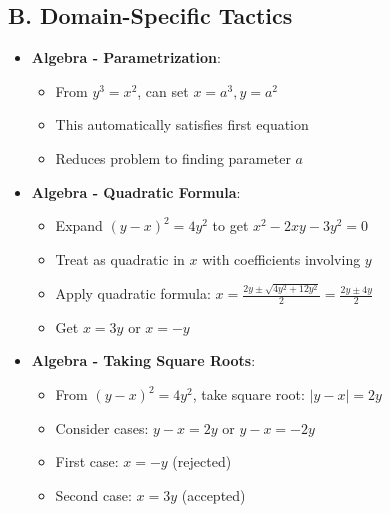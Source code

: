\documentclass[12pt]{article}
\begin{document}
\begin{tacticalbox}
\subsection*{B. Domain-Specific Tactics}
\begin{itemize}[leftmargin=*]
    \item \textbf{Algebra - Parametrization}:
    \begin{itemize}
        \item From $y^3 = x^2$, can set $x = a^3, y = a^2$
        \item This automatically satisfies first equation
        \item Reduces problem to finding parameter $a$
    \end{itemize}
    \item \textbf{Algebra - Quadratic Formula}:
    \begin{itemize}
        \item Expand $(y-x)^2 = 4y^2$ to get $x^2 - 2xy - 3y^2 = 0$
        \item Treat as quadratic in $x$ with coefficients involving $y$
        \item Apply quadratic formula: $x = \frac{2y \pm \sqrt{4y^2 + 12y^2}}{2} = \frac{2y \pm 4y}{2}$
        \item Get $x = 3y$ or $x = -y$
    \end{itemize}
    \item \textbf{Algebra - Taking Square Roots}:
    \begin{itemize}
        \item From $(y-x)^2 = 4y^2$, take square root: $|y-x| = 2y$
        \item Consider cases: $y-x = 2y$ or $y-x = -2y$
        \item First case: $x = -y$ (rejected)
        \item Second case: $x = 3y$ (accepted)
    \end{itemize}
\end{itemize}


\end{tacticalbox}
\end{document}
